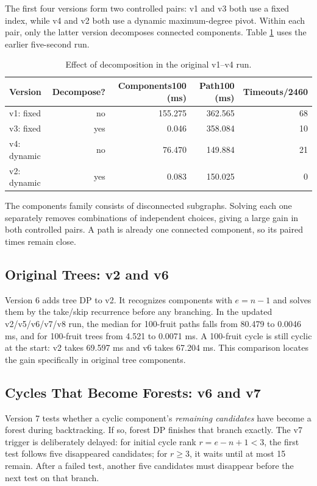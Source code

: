 \documentclass[12pt,a4paper]{report}
\begin{document}
The first four versions form two controlled pairs: v1 and v3 both use a fixed
index, while v4 and v2 both use a dynamic maximum-degree pivot.  Within each
pair, only the latter version decomposes connected components.  Table
\ref{tab:component-perf} uses the earlier five-second run.
\begin{table}[H]\centering\small
\caption{Effect of decomposition in the original v1--v4 run.}
\label{tab:component-perf}
\begin{tabular}{@{}lrrrr@{}}\toprule
Version & Decompose? & Components100 (ms) & Path100 (ms) & Timeouts/2460\\\midrule
v1: fixed & no & 155.275 & 362.565 & 68\\
v3: fixed & yes & 0.046 & 358.084 & 10\\
v4: dynamic & no & 76.470 & 149.884 & 21\\
v2: dynamic & yes & 0.083 & 150.025 & 0\\
\bottomrule\end{tabular}
\end{table}

The components family consists of disconnected subgraphs.  Solving each one
separately removes combinations of independent choices, giving a large gain
in both controlled pairs.  A path is already one connected component, so its
paired times remain close.

\subsection{Original Trees: v2 and v6}

Version 6 adds tree DP to v2.  It recognizes components with $e=n-1$
and solves them by the take/skip recurrence before any branching.
In the updated v2/v5/v6/v7/v8 run, the median for 100-fruit paths falls from
80.479 to 0.0046 ms, and for 100-fruit trees from 4.521 to 0.0071 ms.  A
100-fruit cycle is still cyclic at the start: v2 takes 69.597 ms and v6 takes
67.204 ms.  This comparison locates the gain specifically in original tree
components.

\subsection{Cycles That Become Forests: v6 and v7}

Version 7 tests whether a cyclic component's \emph{remaining candidates}
have become a forest during backtracking.  If so, forest DP finishes that
branch exactly.  The v7 trigger is deliberately delayed: for initial cycle
rank $r=e-n+1<3$, the first test follows five disappeared candidates; for
$r\ge3$, it waits until at most 15 remain.  After a failed test, another five
candidates must disappear before the next test on that branch.
\end{document}
